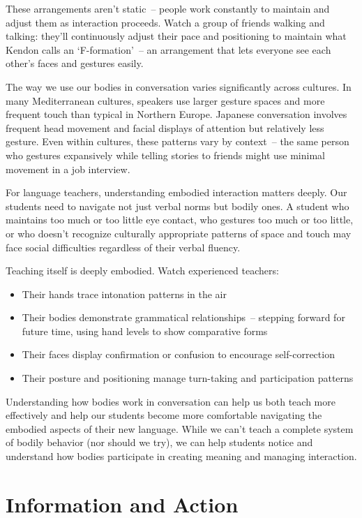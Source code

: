 These arrangements aren't static~-- people work constantly to maintain and adjust them as interaction proceeds. Watch a group of friends walking and talking: they'll continuously adjust their pace and positioning to maintain what Kendon calls an `F-formation'~-- an arrangement that lets everyone see each other's faces and gestures easily.

The way we use our bodies in conversation varies significantly across cultures. In many Mediterranean cultures, speakers use larger gesture spaces and more frequent touch than typical in Northern Europe. Japanese conversation involves frequent head movement and facial displays of attention but relatively less gesture. Even within cultures, these patterns vary by context~-- the same person who gestures expansively while telling stories to friends might use minimal movement in a job interview.

For language teachers, understanding embodied interaction matters deeply. Our students need to navigate not just verbal norms but bodily ones. A student who maintains too much or too little eye contact, who gestures too much or too little, or who doesn't recognize culturally appropriate patterns of space and touch may face social difficulties regardless of their verbal fluency.

Teaching itself is deeply embodied. Watch experienced teachers:
\begin{itemize}[noitemsep]
   \item Their hands trace intonation patterns in the air
   \item Their bodies demonstrate grammatical relationships~-- stepping forward for future time, using hand levels to show comparative forms
   \item Their faces display confirmation or confusion to encourage self-correction
   \item Their posture and positioning manage turn-taking and participation patterns
\end{itemize}

Understanding how bodies work in conversation can help us both teach more effectively and help our students become more comfortable navigating the embodied aspects of their new language. While we can't teach a complete system of bodily behavior (nor should we try), we can help students notice and understand how bodies participate in creating meaning and managing interaction.

\section{Information and Action} \label{sec:info-action}

